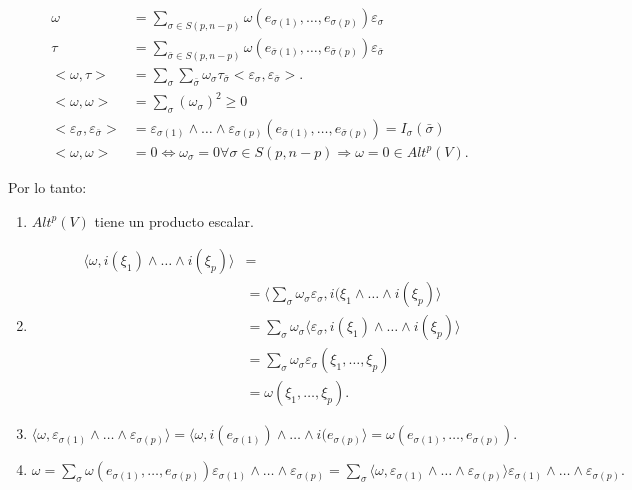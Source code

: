 \begin{itemize*}
  \begin{equation}
    \begin{split}
      \omega &= \sum_{\sigma\in S(p,n-p)}\omega(e_{\sigma(1)},\dots,e_{\sigma(p)})\varepsilon_\sigma \\
      \tau &=\sum_{\bar{\sigma}\in S(p,n-p)}\omega(e_{\bar{\sigma}(1)},\dots,e_{\bar{\sigma}(p)})\varepsilon_{\bar{\sigma} } \\
      <\omega,\tau> &= \sum_{\sigma}\sum_{\bar{\sigma}} \omega_\sigma \tau_{\bar{\sigma}}<\varepsilon_\sigma,\varepsilon_{\bar{\sigma}}>.\\
  <\omega,\omega> &= \sum_\sigma (\omega_\sigma)^2\ge 0 \\
  <\varepsilon_\sigma,\varepsilon_{\bar{\sigma}}>&= \varepsilon_{\sigma(1)}\wedge \dots \wedge \varepsilon_{\sigma(p)}(e_{\bar{\sigma}(1)},\dots, e_{\bar{\sigma}(p)})= I_{\sigma}(\bar{\sigma}) \\
  <\omega,\omega> &=0 \Leftrightarrow \omega_\sigma =0 \forall \sigma \in S(p,n-p)\Rightarrow \omega=0 \in Alt^p(V).
    \end{split}
  \end{equation}
\item Por lo tanto:
  \begin{enumerate}
  \item $Alt^p(V)$ tiene un producto escalar.
  \item
    \begin{equation}
      \begin{split}
        \langle \omega,i(\xi_1)\wedge \dots \wedge i(\xi_p) \rangle &= \\
        &= \langle \sum_\sigma \omega_\sigma \varepsilon_\sigma,i(\xi_1\wedge \dots \wedge i(\xi_p)\rangle \\
        &=\sum_\sigma \omega_\sigma \langle \varepsilon_\sigma,i(\xi_1)\wedge \dots \wedge i(\xi_p) \rangle \\
        &= \sum_\sigma \omega_\sigma \varepsilon_\sigma(\xi_1,\dots,\xi_p) \\
        &= \omega(\xi_1,\dots,\xi_p).
      \end{split}
    \end{equation}
  \item $\langle \omega, \varepsilon_{\sigma(1)}\wedge \dots \wedge \varepsilon_{\sigma(p)} \rangle = \langle \omega, i(e_{\sigma(1)})\wedge \dots \wedge i(e_{\sigma(p)}\rangle = \omega(e_{\sigma(1)},\dots,e_{\sigma(p)}). $
  \item $\omega =\sum_\sigma \omega(e_{\sigma(1)},\dots , e_{\sigma(p)}) \varepsilon_{\sigma(1)} \wedge \dots \wedge \varepsilon_{\sigma(p)} = \sum_\sigma \langle \omega, \varepsilon_{\sigma(1)}\wedge \dots \wedge \varepsilon_{\sigma(p)} \rangle\varepsilon_{\sigma(1)}\wedge \dots \wedge \varepsilon_{\sigma(p)}.$
  \end{enumerate}


\end{itemize*}
